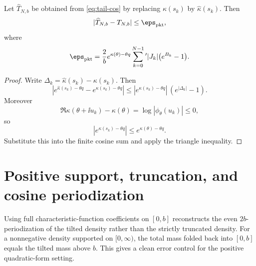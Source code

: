 \begin{theorem}
\label{thm:packet-tail}
Let $\widehat T_{N,b}$ be obtained from \eqref{eq:tail-cos} by replacing $\kappa(s_k)$ by $\widehat\kappa(s_k)$. Then
\begin{equation}
|\widehat T_{N,b}-T_{N,b}|
\le \eps_{\mathrm{pkt}},
\label{eq:packet-tail-bound}
\end{equation}
where
\begin{equation}
\eps_{\mathrm{pkt}}
=
\frac{2}{b}
 e^{\kappa(\theta)-\theta q}
\sum_{k=0}^{N-1}{}'
|J_k|\bigl(e^{B_k}-1\bigr).
\label{eq:eps-pkt}
\end{equation}
\end{theorem}

\begin{proof}
Write $\Delta_k=\widehat\kappa(s_k)-\kappa(s_k)$. Then
\[
|e^{\widehat\kappa(s_k)-\theta q}-e^{\kappa(s_k)-\theta q}|
\le
|e^{\kappa(s_k)-\theta q}|\,(e^{|\Delta_k|}-1).
\]
Moreover
\[
\Re\kappa(\theta+\ii u_k)-\kappa(\theta)
=\log|\phi_{\theta}(u_k)|\le0,
\]
so
\[
|e^{\kappa(s_k)-\theta q}|
\le e^{\kappa(\theta)-\theta q}.
\]
Substitute this into the finite cosine sum and apply the triangle inequality.
\end{proof}

\section{Positive support, truncation, and cosine periodization}

Using full characteristic-function coefficients on $[0,b]$ reconstructs the even $2b$-periodization of the tilted density rather than the strictly truncated density. For a nonnegative density supported on $[0,\infty)$, the total mass folded back into $[0,b]$ equals the tilted mass above $b$. This gives a clean error control for the positive quadratic-form setting.


